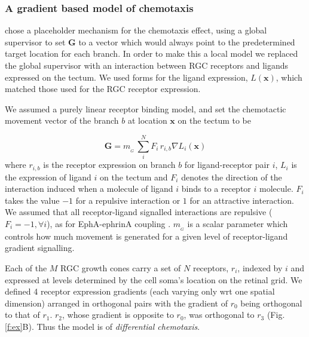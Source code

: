 \documentclass[9pt,lineno,draft]{elife}
\begin{document}
\subsubsection*{A gradient based model of chemotaxis}


\citet{simpson_simple_2011} chose a placeholder mechanism for the chemotaxis effect, using a global supervisor to set $\mathbf{G}$ to a vector which would always point to the predetermined target location for each branch.
In order to make this a local model we replaced the global supervisor with an interaction between RGC receptors and ligands expressed on the tectum. We used forms for the ligand expression, $L(\mathbf{x})$, which matched those used for the RGC receptor expression.

We assumed a purely linear receptor binding model, and set the chemotactic movement vector of the branch $b$ at location $\mathbf{x}$ on the tectum to be

\begin{equation}\label{e:G}
\mathbf{G} = m_{\!_G}\,\sum_i^N F_i\,r_{i,b} \nabla L_i(\mathbf{x})
\end{equation}
%
where $r_{i,b}$ is the receptor expression on branch $b$ for ligand-receptor pair $i$, $L_i$ is the expression of ligand $i$ on the tectum and $F_i$ denotes the direction of the interaction induced when a molecule of ligand $i$ binds to a receptor $i$ molecule.
$F_i$ takes the value $-1$ for a repulsive interaction or $1$ for an attractive interaction.
%
We assumed that all receptor-ligand signalled interactions are repulsive ($F_i=-1, \forall i$), as for EphA-ephrinA coupling \citep{drescher_vitro_1995,nakamoto_topographically_1996}.
%
$m_{\!_G}$ is a scalar parameter which controls how much movement is generated for a given level of receptor-ligand gradient signalling.

Each of the $M$ RGC growth cones carry a set of $N$ receptors, $r_i$, indexed by $i$ and expressed at levels determined by the cell soma's location on the retinal grid.
%
%
We defined 4 receptor expression gradients (each varying only wrt one spatial dimension) arranged in orthogonal pairs with the gradient of $r_0$ being orthogonal to that of $r_1$. $r_2$, whose gradient is opposite to $r_0$, was orthogonal to $r_3$ (Fig.\,\ref{f:ex}B). Thus the model is of \emph{differential chemotaxis}.
\end{document}
